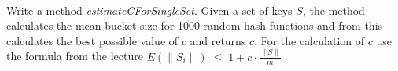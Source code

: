  \\
Write a method \textit{estimateCForSingleSet}.
Given a set of keys $S$, the method calculates the mean bucket size for 1000
random hash functions and from this calculates the best possible value of $c$
and returns $c$.
For the calculation of $c$ use the formula from the lecture
$E(\|S_i\|) \; \leq \; 1 + c \cdot \frac{\|S\|}{m}$